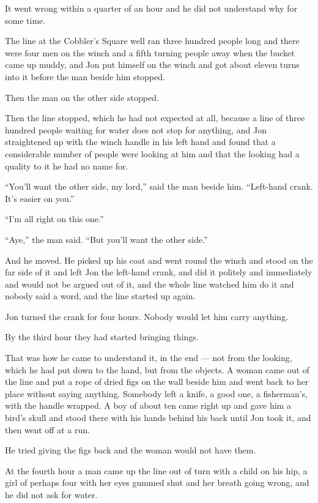 It went wrong within a quarter of an hour and he did not understand why for some time.

The line at the Cobbler’s Square well ran three hundred people long and there were four men on the winch and a fifth turning people away when the bucket came up muddy, and Jon put himself on the winch and got about eleven turns into it before the man beside him stopped.

Then the man on the other side stopped.

Then the line stopped, which he had not expected at all, because a line of three hundred people waiting for water does not stop for anything, and Jon straightened up with the winch handle in his left hand and found that a considerable number of people were looking at him and that the looking had a quality to it he had no name for.

“You’ll want the other side, my lord,” said the man beside him. “Left-hand crank. It’s easier on you.”

“I’m all right on this one.”

“Aye,” the man said. “But you’ll want the other side.”

And he moved. He picked up his coat and went round the winch and stood on the far side of it and left Jon the left-hand crank, and did it politely and immediately and would not be argued out of it, and the whole line watched him do it and nobody said a word, and the line started up again.

Jon turned the crank for four hours. Nobody would let him carry anything.

\sceneBreak

By the third hour they had started bringing things.

That was how he came to understand it, in the end — not from the looking, which he had put down to the hand, but from the objects. A woman came out of the line and put a rope of dried figs on the wall beside him and went back to her place without saying anything. Somebody left a knife, a good one, a fisherman’s, with the handle wrapped. A boy of about ten came right up and gave him a bird’s skull and stood there with his hands behind his back until Jon took it, and then went off at a run.

He tried giving the figs back and the woman would not have them.

At the fourth hour a man came up the line out of turn with a child on his hip, a girl of perhaps four with her eyes gummed shut and her breath going wrong, and he did not ask for water.

